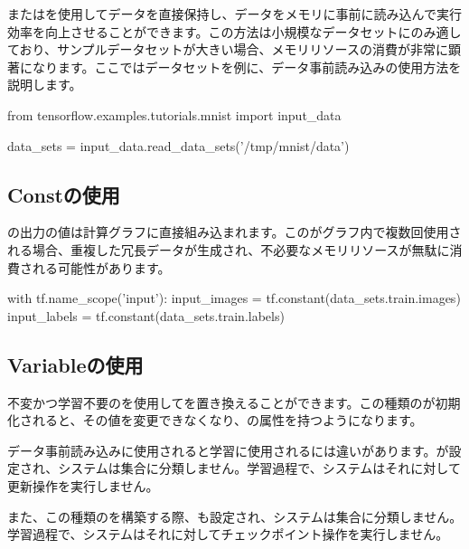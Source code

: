 \begin{content}

またはを使用してデータを直接保持し、データをメモリに事前に読み込んで実行効率を向上させることができます。この方法は小規模なデータセットにのみ適しており、サンプルデータセットが大きい場合、メモリリソースの消費が非常に顕著になります。ここではデータセットを例に、データ事前読み込みの使用方法を説明します。


\begin{leftbar}
\begin{python}
from tensorflow.examples.tutorials.mnist import input_data

data_sets = input_data.read_data_sets('/tmp/mnist/data')
\end{python}
\end{leftbar}

\subsection{Constの使用}

の出力の値は計算グラフに直接組み込まれます。このがグラフ内で複数回使用される場合、重複した冗長データが生成され、不必要なメモリリソースが無駄に消費される可能性があります。


\begin{leftbar}
\begin{python}
with tf.name_scope('input'):
  input_images = tf.constant(data_sets.train.images)
  input_labels = tf.constant(data_sets.train.labels)
\end{python}
\end{leftbar}

\subsection{Variableの使用}

不変かつ学習不要のを使用してを置き換えることができます。この種類のが初期化されると、その値を変更できなくなり、の属性を持つようになります。

データ事前読み込みに使用されると学習に使用されるには違いがあります。が設定され、システムは集合に分類しません。学習過程で、システムはそれに対して更新操作を実行しません。

また、この種類のを構築する際、も設定され、システムは集合に分類しません。学習過程で、システムはそれに対してチェックポイント操作を実行しません。


\end{content}

